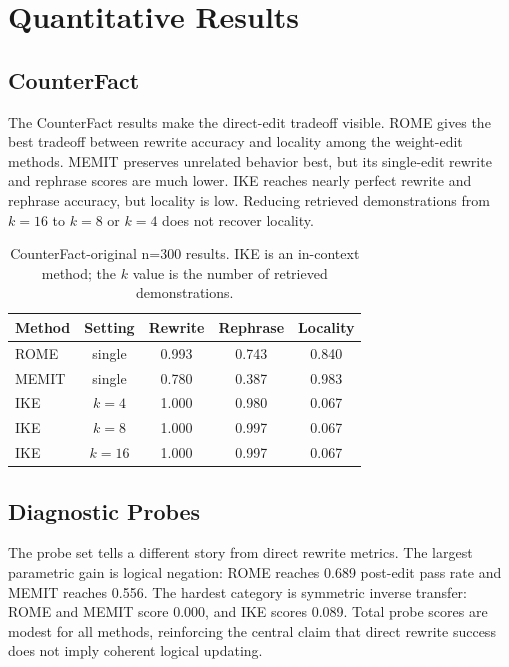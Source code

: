 \documentclass[11pt]{article}
\begin{document}
\section{Quantitative Results}

\subsection{CounterFact}

The CounterFact results make the direct-edit tradeoff visible. ROME gives the best tradeoff between rewrite accuracy and locality among the weight-edit methods. MEMIT preserves unrelated behavior best, but its single-edit rewrite and rephrase scores are much lower. IKE reaches nearly perfect rewrite and rephrase accuracy, but locality is low. Reducing retrieved demonstrations from $k=16$ to $k=8$ or $k=4$ does not recover locality.

\begin{table}[!htbp]
\centering
\small
\begin{tabular*}{\columnwidth}{@{\extracolsep{\fill}}lcccc@{}}
\toprule
Method & Setting & Rewrite & Rephrase & Locality \\
\midrule
ROME & single & 0.993 & 0.743 & 0.840 \\
MEMIT & single & 0.780 & 0.387 & 0.983 \\
IKE & $k=4$ & 1.000 & 0.980 & 0.067 \\
IKE & $k=8$ & 1.000 & 0.997 & 0.067 \\
IKE & $k=16$ & 1.000 & 0.997 & 0.067 \\
\bottomrule
\end{tabular*}
\caption{CounterFact-original n=300 results. IKE is an in-context method; the $k$ value is the number of retrieved demonstrations.}
\label{tab:counterfact}
\end{table}

\subsection{Diagnostic Probes}

The probe set tells a different story from direct rewrite metrics. The largest parametric gain is logical negation: ROME reaches 0.689 post-edit pass rate and MEMIT reaches 0.556. The hardest category is symmetric inverse transfer: ROME and MEMIT score 0.000, and IKE scores 0.089. Total probe scores are modest for all methods, reinforcing the central claim that direct rewrite success does not imply coherent logical updating.
\end{document}
